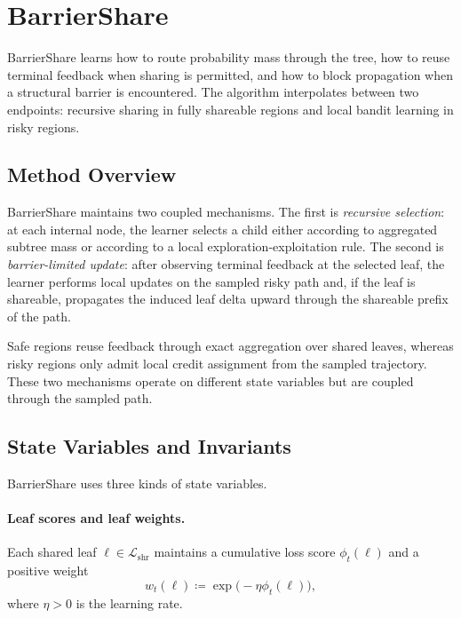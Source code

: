 \documentclass{article}
\begin{document}
\section{BarrierShare}
\label{sec:barriershare}

BarrierShare learns how to route probability mass through the tree, how to reuse terminal feedback when sharing is permitted, and how to block propagation when a structural barrier is encountered. The algorithm interpolates between two endpoints: recursive sharing in fully shareable regions and local bandit learning in risky regions.

\subsection{Method Overview}
\label{sec:barriershare_overview}

BarrierShare maintains two coupled mechanisms. The first is \emph{recursive selection}: at each internal node, the learner selects a child either according to aggregated subtree mass or according to a local exploration-exploitation rule. The second is \emph{barrier-limited update}: after observing terminal feedback at the selected leaf, the learner performs local updates on the sampled risky path and, if the leaf is shareable, propagates the induced leaf delta upward through the shareable prefix of the path.

Safe regions reuse feedback through exact aggregation over shared leaves, whereas risky regions only admit local credit assignment from the sampled trajectory. These two mechanisms operate on different state variables but are coupled through the sampled path.

\subsection{State Variables and Invariants}
\label{sec:barriershare_state}

BarrierShare uses three kinds of state variables.

\paragraph{Leaf scores and leaf weights.}
Each shared leaf $\ell \in \mathcal{L}_{\mathrm{shr}}$ maintains a cumulative loss score $\phi_t(\ell)$ and a positive weight
\begin{equation}
    w_t(\ell) \coloneqq \exp\!\bigl(-\eta \phi_t(\ell)\bigr),
    \label{eq:leaf_weight_def}
\end{equation}
where $\eta>0$ is the learning rate.
\end{document}
